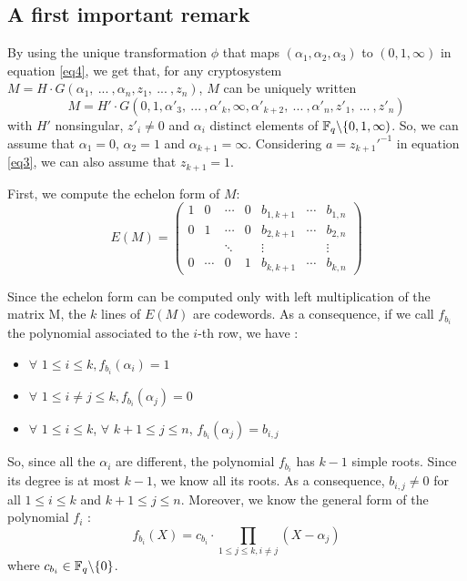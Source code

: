 \documentclass[a4paper]{article}
\begin{document}
\subsection{A first important remark}

By using the unique transformation $\phi$ that maps $(\alpha_1, \alpha_2, \alpha_3)$ to $(0,1,\infty)$ in equation \eqref{eq4}, we get that, for any cryptosystem $M = H\cdot G(\alpha_1, \ ... \ , \alpha_n, z_1, \ ... \ , z_n)$, $M$ can be uniquely written
$$ M = H'\cdot G(0, 1,\alpha'_3, \ ... \ ,\alpha'_k, \infty, \alpha'_{k+2}, \ ... \ , \alpha'_n, z'_1, \ ... \ , z'_n) $$
with $H'$ nonsingular, $z'_i \neq 0$ and $\alpha_i$ distinct elements of $\mathbb{F}_q\backslash\{0, 1, \infty)$.
So, we can assume that $\alpha_1 = 0$, $\alpha_2 = 1$ and $\alpha_{k+1} = \infty$.
Considering $a=z_{k+1}'^{-1}$ in equation \eqref{eq3}, we can also assume that $z_{k+1}=1$.

First, we compute the echelon form of $M$:
$$ E(M) = 
\left(
\begin{array}{ccccccc}
1 & 0 & \cdots & 0 & b_{1,k+1} & \cdots & b_{1,n} \\
0 & 1 & \cdots & 0 & b_{2,k+1} & \cdots & b_{2,n} \\
  &   & \ddots &   & \vdots &   & \vdots \\
0 & \cdots & 0 & 1 & b_{k,k+1} & \cdots & b_{k,n}
\end{array}
\right)
$$

Since the echelon form can be computed only with left multiplication of the matrix M, the $k$ lines of $E(M)$ are codewords. As a consequence, if we call $f_{b_i}$ the polynomial associated to the $i$-th
row, we have :
\begin{itemize}
\item $\forall$  $1\leq i\leq k, f_{b_i}(\alpha_i)=1 $
\item $\forall$  $1\leq i\neq j\leq k, f_{b_i}(\alpha_j)=0 $
\item $\forall$  $1\leq i\leq k$, $\forall$ $k+1\leq j\leq n$, $f_{b_i}(\alpha_j)=b_{i,j} $
\end{itemize}

So, since all the $\alpha_i$ are different, the polynomial $f_{b_i}$ has $k-1$ simple roots. Since its degree is at most $k-1$, we know all its roots. As a consequence, $b_{i,j}\neq0$ for all $1\leq i\leq k$ and $k+1\leq j\leq n$. Moreover, we know the general 
form of the polynomial $f_i$ :
\begin{equation}
f_{b_i}(X) = c_{b_i}\cdot \prod_{1\leq j\leq k, i\neq j} (X-\alpha_j)
\label{eq5}
\end{equation}
where $c_{b_i} \in \mathbb{F}_q\backslash\{0\}$.
\end{document}
